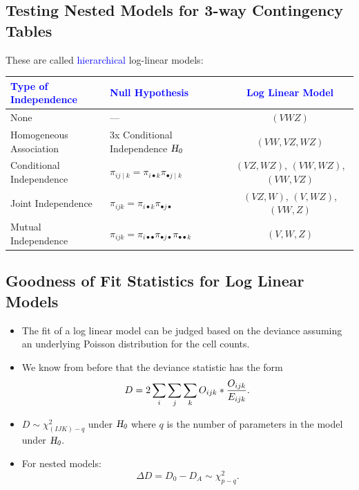 \documentclass{article}\usepackage[]{graphicx}\usepackage[svgnames]{xcolor}
\let\log\relax%
\newcommand{\HN}{\textsl{H}_{\textsl{0}}}%
\begin{document}
\subsection*{Testing Nested Models for 3-way Contingency Tables}
These are called \textcolor{Blue}{hierarchical} log-linear models:
\begin{table}[H]
      \centering
      \begin{tabular}{llc}
            \textcolor{Blue}{Type of Independence} & \textcolor{Blue}{Null Hypothesis}                                               & \textcolor{Blue}{Log Linear Model}    \\
            \midrule
            None                                   & ---                                                                             & $ (VWZ) $                             \\
            Homogeneous Association                & 3x Conditional Independence $ \HN $                                             & $ (VW,VZ,WZ) $                        \\
            Conditional Independence               & $ \pi_{ij\mid k}=\pi_{i\bullet k}\pi_{\bullet j\mid k} $                        & $ (VZ,WZ) $, $ (VW,WZ) $, $ (VW,VZ) $ \\
            Joint Independence                     & $ \pi_{ijk}=\pi_{i\bullet k}\pi_{\bullet j\bullet} $                            & $ (VZ,W) $, $ (V,WZ) $, $ (VW,Z) $    \\
            Mutual Independence                    & $ \pi_{ijk}=\pi_{i\bullet\bullet}\pi_{\bullet j\bullet}\pi_{\bullet\bullet k} $ & $ (V,W,Z) $                           \\
            \bottomrule
      \end{tabular}
\end{table}
\subsection*{Goodness of Fit Statistics for Log Linear Models}
\begin{itemize}
      \item The fit of a log linear model can be judged based on the deviance assuming an
            underlying Poisson distribution for the cell counts.
      \item We know from before that the deviance statistic has the form
            \[ D=2\sum_i\sum_j\sum_k O_{ijk}\log*{\frac{O_{ijk}}{E_{ijk}}}. \]
      \item $ D \sim \chi^2_{(IJK)-q} $ under $ \HN $ where $ q $ is the number of parameters in the model under $ \HN $.
      \item For nested models:
            \[ \Delta D=D_0-D_A \sim \chi^2_{p-q}. \]
\end{itemize}
\end{document}
